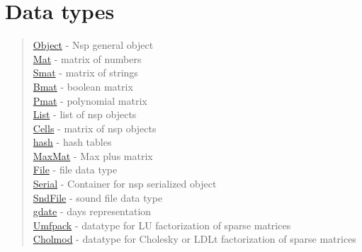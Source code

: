 \chapter*{Data types}


\begin{quote}
\noindent
\hyperlink{Object}{Object} - Nsp general object  \\
\hyperlink{Mat}{Mat} - matrix of numbers \\
\hyperlink{Smat}{Smat} - matrix of strings  \\
\hyperlink{Bmat}{Bmat} - boolean matrix  \\
\hyperlink{Pmat}{Pmat} - polynomial matrix  \\
\hyperlink{list}{List} - list  of nsp objects  \\
\hyperlink{Cells}{Cells} - matrix of nsp objects  \\
\hyperlink{hash}{hash} - hash tables  \\
\hyperlink{MaxMat}{MaxMat} - Max plus matrix  \\
\hyperlink{File}{File} - file data type  \\
\hyperlink{Serial}{Serial} - Container for nsp serialized object \\
\hyperlink{SndFile}{SndFile} - sound file data type \\
\hyperlink{gdate}{gdate} - days representation \\
\hyperlink{Umfpack}{Umfpack} - datatype for LU factorization of sparse matrices \\
\hyperlink{Cholmod}{Cholmod} - datatype for Cholesky or LDLt factorization of sparse matrices \\
\end{quote}


 
 
 
 
 
 
 
 
 
 
 
 
 
 
 

